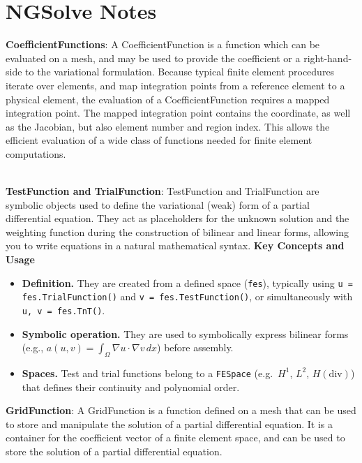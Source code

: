 \documentclass[../main.tex]{subfiles}
\begin{document}
\section{NGSolve Notes}
\textbf{CoefficientFunctions}: A CoefficientFunction is a function which can be evaluated on a mesh, and may be used to provide the coefficient or a right-hand-side to the variational formulation. Because typical finite element procedures iterate over elements, and map integration points from a reference element to a physical element, the evaluation of a CoefficientFunction requires a mapped integration point. The mapped integration point contains the coordinate, as well as the Jacobian, but also element number and region index. This allows the efficient evaluation of a wide class of functions needed for finite element computations.

\ \\
\textbf{TestFunction and TrialFunction}: TestFunction and TrialFunction are symbolic objects used to define the variational (weak) form of a partial differential equation. They act as placeholders for the unknown solution and the weighting function during the construction of bilinear and linear forms, allowing you to write equations in a natural mathematical syntax.
\textbf{Key Concepts and Usage}
\begin{itemize}
    \item \textbf{Definition.}
    They are created from a defined space (\texttt{fes}), typically using
    \texttt{u = fes.TrialFunction()} and \texttt{v = fes.TestFunction()},
    or simultaneously with \texttt{u, v = fes.TnT()}.
    \item \textbf{Symbolic operation.}
    They are used to symbolically express bilinear forms (e.g.,
    \(a(u,v) = \int_\Omega \nabla u \cdot \nabla v \, dx\))
    before assembly.
    \item \textbf{Spaces.}
    Test and trial functions belong to a \texttt{FESpace}
    (e.g.\ \(H^1\), \(L^2\), \(H(\mathrm{div})\)) that defines their
    continuity and polynomial order.
\end{itemize}

\textbf{GridFunction}: A GridFunction is a function defined on a mesh that can be used to store and manipulate the solution of a partial differential equation. It is a container for the coefficient vector of a finite element space, and can be used to store the solution of a partial differential equation.
\end{document}

